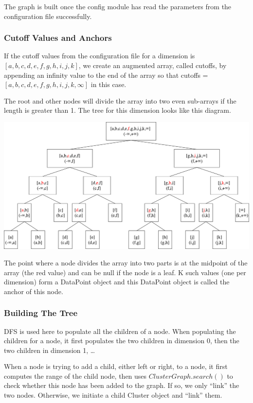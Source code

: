 \documentclass{article}
\begin{document}
The graph is built once the config module has read the parameters from the configuration file successfully. 

\subsubsection{Cutoff Values and Anchors}

If the cutoff values from the configuration file for a dimension is \([a,b,c,d,e,f,g,h,i,j,k]\), we create an augmented array, called cutoffs, by appending an infinity value to the end of the array so that cutoffs = \([a,b,c,d,e,f,g,h,i,j,k,\infty]\) in this case. 

The root and other nodes will divide the array into two even sub-arrays if the length is greater than 1. The tree for this dimension looks like this diagram.

\begin{center}
   \includegraphics[scale=0.05]{ClusterGraph}
\end{center}

The point where a node divides the array into two parts is at the midpoint of the array (the red value) and can be null if the node is a leaf. K such values (one per dimension) form a DataPoint object and this DataPoint object is called the anchor of this node.

\subsubsection{Building The Tree}

DFS is used here to populate all the children of a node. When populating the children for a node, it first populates the two children in dimension 0, then the two children in dimension 1, …

When a node is trying to add a child, either left or right, to a node, it first computes the range of the child node, then uses \(ClusterGraph.search()\) to check whether this node has been added to the graph. If so, we only “link” the two nodes. Otherwise, we initiate a child Cluster object and “link” them.
\end{document}
